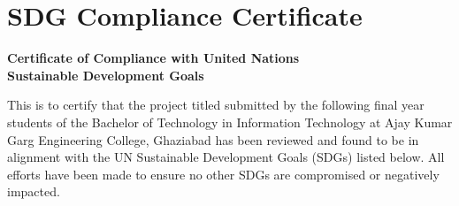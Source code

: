 \chapter{SDG Compliance Certificate}
\label{app:unai}

\thispagestyle{empty}
\begin{center}
{\Large\textbf{Certificate of Compliance with United Nations\\[4pt]
Sustainable Development Goals}}
\end{center}

\vspace{0.1cm}

This is to certify that the project titled \textbf{\reporttitle} submitted by
the following final year students of the Bachelor of Technology in Information Technology at Ajay Kumar Garg Engineering College, Ghaziabad
has been reviewed and found to be in alignment with the UN Sustainable
Development Goals (SDGs) listed below. All efforts have been made to ensure
no other SDGs are compromised or negatively impacted.

\vspace{0.1cm}

